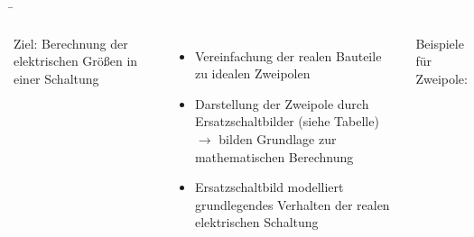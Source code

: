 \begin{frame}

	\b{
	\begin{columns}

	Ziel: Berechnung der elektrischen Größen in einer Schaltung

	\vspace{5pt}
	\begin{itemize}
		\item Vereinfachung der realen Bauteile zu idealen Zweipolen
		\item Darstellung der Zweipole durch Ersatzschaltbilder (siehe Tabelle)\\
		$\rightarrow$ bilden Grundlage zur mathematischen Berechnung		
		\item Ersatzschaltbild modelliert grundlegendes Verhalten der realen elektrischen Schaltung
		
	\end{itemize}
	

	Beispiele für Zweipole:



	



\end{columns}}
\end{frame}

